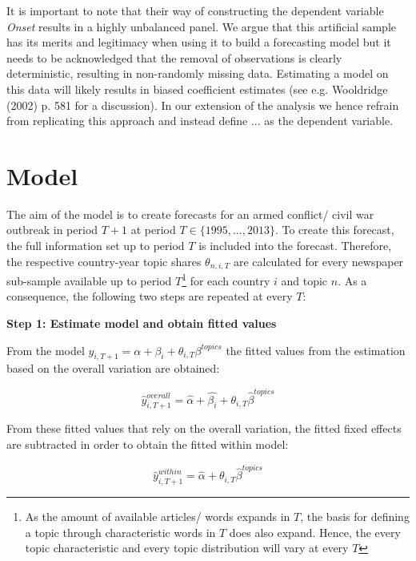 It is important to note that their way of constructing the dependent variable \textit{Onset} results in a highly unbalanced panel.
We argue that this artificial sample has its merits and legitimacy when using it to build a forecasting model but it needs to be acknowledged that the removal of observations is clearly deterministic, resulting in non-randomly missing data.
Estimating a model on this data will likely results in biased coefficient estimates (see e.g. Wooldridge (2002) p. 581 for a discussion).
In our extension of the analysis we hence refrain from replicating this approach and instead define ... as the dependent variable.


\section{Model}
The aim of the model is to create forecasts for an armed conflict/ civil war outbreak in period $T+1$ at period $T \in \{1995,..., 2013\}$.
To create this forecast, the full information set up to period $T$ is included into the forecast.
Therefore, the respective country-year topic shares $\theta_{n,i,T}$ are calculated for every newspaper sub-sample available up to period $T$\footnote{As the amount of available articles/ words expands in $T$, the basis for defining a topic through characteristic words in $T$ does also expand. Hence, the every topic characteristic and every topic distribution will vary at every $T$} for each country $i$ and topic $n$.
As a consequence, the following two steps are repeated at every $T$:

\noindent\textbf{Step 1: Estimate model and obtain fitted values}

\noindent From the model $y_{i,T+1} = \alpha + \beta_{i} + \theta_{i,T}\beta^{topics}$ the fitted values from the estimation based on the overall variation are obtained:

\begin{equation}
    \hat{y}_{i,T+1}^{overall} = \hat{\alpha} + \hat{\beta_i} + \theta_{i,T}\hat{\beta}^{topics}
\end{equation}

\noindent From these fitted values that rely on the overall variation, the fitted fixed effects are subtracted in order to obtain the fitted within model:

\begin{equation}
    \hat{y}_{i,T+1}^{within} = \hat{\alpha} + \theta_{i,T}\hat{\beta}^{topics}
\end{equation}

